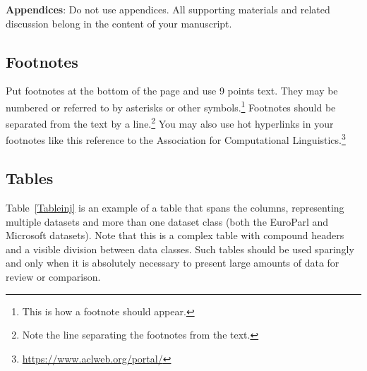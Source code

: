 \documentclass[11pt,table,xcdraw]{article}
\begin{document}
{\bf Appendices}: Do not use appendices. All supporting materials and related discussion belong in the content of your manuscript.

\subsection{Footnotes}

Put footnotes at the bottom of the page and use 9
points text. They may be numbered or referred to by asterisks or other
symbols.\footnote{This is how a footnote should appear.} Footnotes
should be separated from the text by a line.\footnote{Note the line
separating the footnotes from the text.} You may also use hot hyperlinks in your footnotes like this reference to the Association for Computational Linguistics.\footnote{\url{https://www.aclweb.org/portal/}}



\subsection{Tables}

Table~\ref{Tableinj} is an example of a table that spans the columns, representing multiple datasets and more than one dataset class (both the EuroParl and Microsoft datasets). Note that this is a complex table with compound headers and a visible division between data classes. Such tables should be used sparingly and only when it is absolutely necessary to present large amounts of data for review or comparison.
\end{document}
